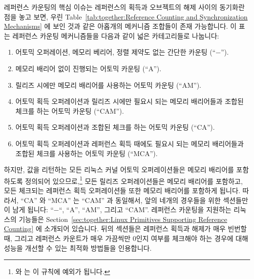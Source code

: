 레퍼런스 카운팅의 핵심 이슈는 레퍼런스의 획득과 오브젝트의 해제 사이의 동기화란
점을 놓고 보면, 우린
Table~\ref{tab:together:Reference Counting and Synchronization Mechanisms} 에
보인 것과 같은 아홉개의 메커니즘 조합들이 존재 가능합니다.
이 표는 레퍼런스 카운팅 메커니즘들을 다음과 같이 넓은 카테고리들로 나눕니다:
\iffalse

Given that the key reference-counting issue
is synchronization between acquisition
of a reference and freeing of the object, we have nine possible
combinations of mechanisms, as shown in
Table~\ref{tab:together:Reference Counting and Synchronization Mechanisms}.
This table
divides reference-counting mechanisms into the following broad categories:
\fi
\begin{enumerate}
\item	어토믹 오퍼레이션, 메모리 베리어, 정렬 제약도 없는 간단한 카운팅
	(``$-$'').
\item	메모리 배리어 없이 진행되는 어토믹 카운팅 (``A'').
\item	릴리즈 시에만 메모리 배리어를 사용하는 어토믹 카운팅 (``AM'').
\item	어토믹 획득 오퍼레이션과 릴리즈 시에만 필요시 되는 메모리 배리어들과
	조합된 체크를 하는 어토믹 카운팅 (``CAM'').
\item	어토믹 획득 오퍼레이션과 조합된 체크를 하는 어토믹 카운팅 (``CA'').
\item	어토믹 획득 오퍼레이션과 레퍼런스 획득 때에도 필요시 되는 메모리
	배리어들과 조합된 체크를 사용하는 어토믹 카운팅 (``MCA'').
\iffalse

\item	Simple counting with neither atomic operations, memory
	barriers, nor alignment constraints (``$-$'').
\item	Atomic counting without memory barriers (``A'').
\item	Atomic counting, with memory barriers required only on release
	(``AM'').
\item	Atomic counting with a check combined with the atomic acquisition
	operation, and with memory barriers required only on release
	(``CAM'').
\item	Atomic counting with a check combined with the atomic acquisition
	operation (``CA'').
\item	Atomic counting with a check combined with the atomic acquisition
	operation, and with memory barriers also required on acquisition
	(``MCA'').
\fi
\end{enumerate}
하지만, 값을 리턴하는 모든 리눅스 커널 어토믹 오퍼레이션들은 메모리 배리어를
포함하도록 정의되어 있으므로,\footnote{
	 와  는 이 규칙에 예외가 됩니다.}
모든 릴리즈 오퍼레이션들은 메모리 배리어를 포함하고, 모든 체크되는 레퍼런스
획득 오퍼레이션들 또한 메모리 배리어를 포함하게 됩니다.
따라서, ``CA'' 와 ``MCA'' 는 ``CAM'' 과 동일해서, 앞의 네개의 경우들을 위한
섹션들만이 남게 됩니다:
``$-$``, ``A'', ``AM'', 그리고 ``CAM''.
레퍼런스 카운팅을 지원하는 리눅스의 기능들은
Section~\ref{sec:together:Linux Primitives Supporting Reference Counting} 에
소개되어 있습니다.
뒤의 섹션들은 레퍼런스 획득과 해제가 매우 빈번할 때, 그리고 레퍼런스 카운트가
매우 가끔씩만 0인지 여부를 체크해야 하는 경우에 대해 성능을 개선할 수 있는
최적화 방법들을 인용합니다.
\iffalse


